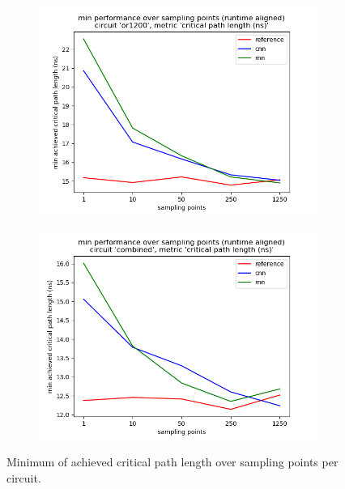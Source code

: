 \begin{figure}[H]
\begin{subfigure}[b]{0.49\linewidth}
		\includegraphics[width=\linewidth]{plots/eval-or1200-critical-path-min-full.png}
	\end{subfigure}
	\begin{subfigure}[b]{0.49\linewidth}
		\includegraphics[width=\linewidth]{plots/eval-combined-critical-path-min-full.png}
	\end{subfigure}
	\caption{Minimum of achieved critical path length over sampling points per circuit.}
	\label{fig:eval-critical-path-min}
\end{figure}

\let\svaddcontentsline\addcontentsline
\renewcommand\addcontentsline[3]{%
	\edef\qtest{#1}%
	\def\qmatch{lof}%
	\ifx\qmatch\qtest\else%
	\def\qmatch{lot}%
	\ifx\qmatch\qtest\else%
	\svaddcontentsline{#1}{#2}{#3}%
	\fi\fi%
}

